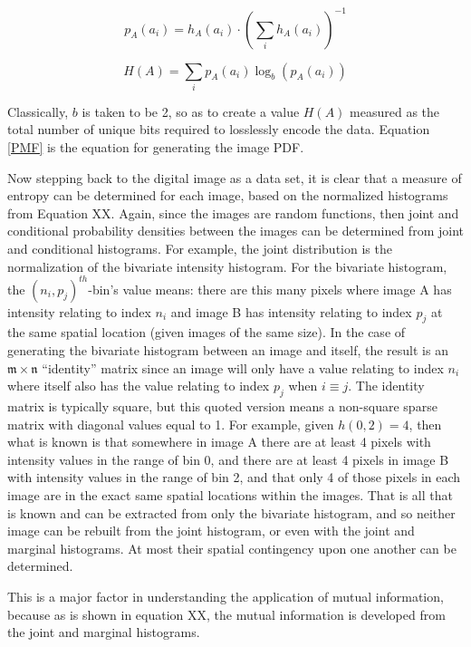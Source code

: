 \begin{equation}
\label{PMF}
	p_{A}(a_{i})=h_{A}(a_{i}) \cdot \left(\sum_{i}{h_{A}(a_{i})} \right)^{-1}
\end{equation}

\begin{equation}
\label{entropy}
	H(A) = \sum_{i}{p_{A}(a_{i}) \log_{b}{\left(p_{A}(a_{i})\right)}}
\end{equation}

Classically, $b$ is taken to be 2, so as to create a value $H(A)$ measured as the total number of unique bits required to losslessly encode the data. Equation \ref{PMF} is the equation for generating the image PDF.

Now stepping back to the digital image as a data set, it is clear that a measure of entropy can be determined for each image, based on the normalized histograms from Equation XX. Again, since the images are random functions, then joint and conditional probability densities between the images can be determined from joint and conditional histograms. For example, the joint distribution is the normalization of the bivariate intensity histogram. For the bivariate histogram, the $(n_{i},p_{j})^{th}${-}bin's value means: there are this many pixels where image A has intensity relating to index $n_{i}$ and image B has intensity relating to index $p_{j}$ at the same spatial location (given images of the same size). In the case of generating the bivariate histogram between an image and itself, the result is an $\mathfrak{m} \times \mathfrak{n}$ ``identity'' matrix since an image will only have a value relating to index $n_{i}$ where itself also has the value relating to index $p_{j}$ when $i \equiv j$. The identity matrix is typically square, but this quoted version means a non-square sparse matrix with diagonal values equal to 1. For example, given $h(0,2)=4$, then what is known is that somewhere in image A there are at least 4 pixels with intensity values in the range of bin 0, and there are at least 4 pixels in image B with intensity values in the range of bin 2, and that only 4 of those pixels in each image are in the exact same spatial locations within the images. That is all that is known and can be extracted from only the bivariate histogram, and so neither image can be rebuilt from the joint histogram, or even with the joint and marginal histograms. At most their spatial contingency upon one another can be determined.

This is a major factor in understanding the application of mutual information, because as is shown in equation XX, the mutual information is developed from the joint and marginal histograms.

